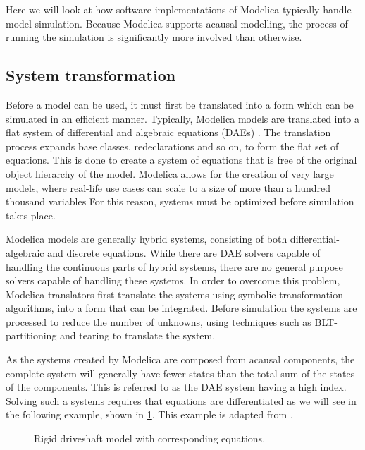 \documentclass[\rootfolder/main.tex]{subfiles}
\begin{document}
Here we will look at how software implementations of Modelica typically handle model simulation.
Because Modelica supports acausal modelling, the process of running the simulation is significantly more involved than otherwise.

\subsection{System transformation}

Before a model can be used, it must first be translated into a form which can be simulated in an efficient manner.
Typically, Modelica models are translated into a flat system of differential and algebraic equations (DAEs) \cite{openmodelica.org:lundvall:sims:2005}.
The translation process expands base classes, redeclarations and so on, to form the flat set of equations.
This is done to create a system of equations that is free of the original object hierarchy of the model.
Modelica allows for the creation of very large models, where real-life use cases can scale to a size of more than a hundred thousand variables
For this reason, systems must be optimized before simulation takes place.

Modelica models are generally hybrid systems, consisting of both differential-algebraic and discrete equations.
While there are DAE solvers capable of handling the continuous parts of hybrid systems, there are no general purpose solvers capable of handling these systems.
In order to overcome this problem, Modelica translators first translate the systems using symbolic transformation algorithms, into a form that can be integrated.
Before simulation the systems are processed to reduce the number of unknowns, using techniques such as BLT-partitioning and tearing \cite{clauss2002} to translate the system.

As the systems created by Modelica are composed from acausal components, the complete system will generally have fewer states than the total sum of the states of the components.
This is referred to as the DAE system having a high index.
Solving such a systems requires that equations are differentiated as we will see in the following example, shown in \cref{fig:modelica-inertial-equations}.
This example is adapted from \cite{clauss2002}.

\begin{figure}[ht]
	\begin{minipage}[c]{.75\columnwidth}
	\end{minipage}%
	\begin{minipage}[c]{.25\columnwidth}
	\end{minipage}
    \caption{Rigid driveshaft model with corresponding equations.\label{fig:modelica-inertial-equations}}
\end{figure}
\end{document}
